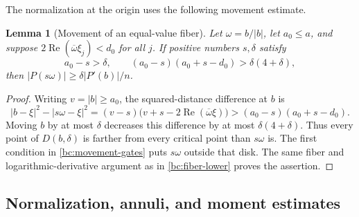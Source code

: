 \documentclass[11pt,reqno]{amsart}
\numberwithin{equation}{section}
\newtheorem{lemma}[theorem]{Lemma}
\theoremstyle{definition}
\theoremstyle{remark}
\renewcommand{\Re}{\operatorname{Re}}
\begin{document}
The normalization at the origin uses the following movement estimate.

\begin{lemma}[Movement of an equal-value fiber]\label{bc:movement}
Let $\omega=b/|b|$, let $a_0\leq a$, and suppose
$2\Re(\overline\omega\xi_j)<d_0$ for all $j$.  If positive numbers
$s,\delta$ satisfy
\begin{equation}\label{bc:movement-gates}
 a_0-s>\delta,\qquad
 (a_0-s)(a_0+s-d_0)>\delta(4+\delta),
\end{equation}
then $|P(s\omega)|\geq\delta|P'(b)|/n$.
\end{lemma}

\begin{proof}
Writing $v=|b|\geq a_0$, the squared-distance difference at $b$ is
\[
 |b-\xi|^2-|s\omega-\xi|^2
 =(v-s)\bigl(v+s-2\Re(\overline\omega\xi)\bigr)
 >(a_0-s)(a_0+s-d_0).
\]
Moving $b$ by at most $\delta$ decreases this difference by at most
$\delta(4+\delta)$.  Thus every point of $D(b,\delta)$ is farther
from every critical point than $s\omega$ is.  The first condition in
\eqref{bc:movement-gates} puts $s\omega$ outside that disk.  The same
fiber and logarithmic-derivative argument as in
\eqref{bc:fiber-lower} proves the assertion.
\end{proof}

\subsection{Normalization, annuli, and moment estimates}
\end{document}
